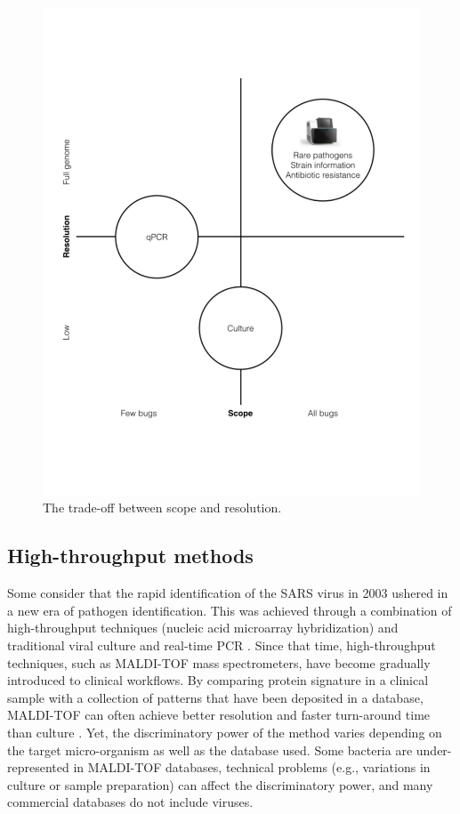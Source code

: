 \begin{figure}
\center\includegraphics[width=125mm,scale=0.5]{Figures/Fig2}
\caption{The trade-off between scope and resolution.}
\label{fig:Fig2}
\end{figure}

\subsection{High-throughput methods}

Some consider that the rapid identification of the SARS virus in 2003 ushered in a new era of pathogen identification. This was achieved through a combination of high-throughput techniques (nucleic acid microarray hybridization) and traditional viral culture and real-time PCR \cite{Boyd:2013cc}. Since that time, high-throughput techniques, such as MALDI-TOF mass spectrometers, have become gradually introduced to clinical workflows. By comparing protein signature in a clinical sample with a collection of patterns that have been deposited in a database, MALDI-TOF can often achieve better resolution and faster turn-around time than culture \cite{Fox:2014fj}. Yet, the discriminatory power of the method varies depending on the target micro-organism as well as the database used. Some bacteria are under-represented in MALDI-TOF databases, technical problems (e.g., variations in culture or sample preparation) can affect the discriminatory power, and many commercial databases do not include viruses. 

